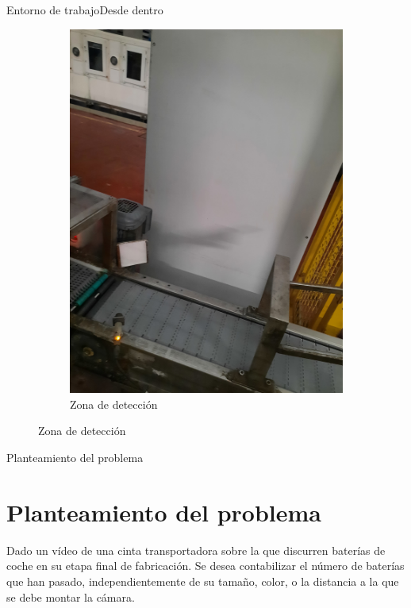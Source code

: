 \documentclass{beamer}
\begin{document}
\begin{frame}{Entorno de trabajo}{Desde dentro}
\begin{figure}
\begin{subfigure}[t]{0.3\textwidth}
  \includegraphics[width = \textwidth, angle=270]{img/angulo}
  \caption{Zona de detección}
  \label{fig:angulo}
\end{subfigure}
\end{figure}
\end{frame}

\begin{frame}{Planteamiento del problema}
\section{Planteamiento del problema}
Dado un vídeo de una cinta transportadora sobre la que discurren baterías de coche en su etapa final de fabricación. Se desea contabilizar el número de baterías que han pasado, independientemente de su tamaño, color, o la distancia a la que se debe montar la cámara.
\end{frame}
\end{document}
